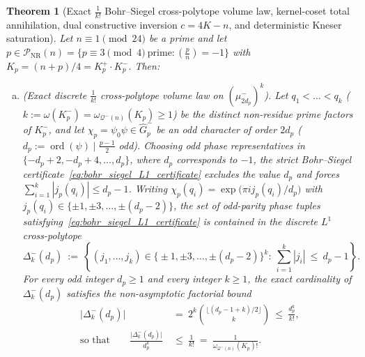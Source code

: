 \documentclass[11pt, a4paper]{article}
\theoremstyle{plain}
\newtheorem{theorem}{Theorem}[section]
\theoremstyle{definition}
\newcommand{\leg}[2]{\left(\frac{#1}{#2}\right)}
\begin{document}
\begin{theorem}[Exact $\frac{1}{k!}$ Bohr--Siegel cross-polytope volume law, kernel-coset total annihilation, dual constructive inversion $c=4K-n$, and deterministic Kneser saturation]\label{thm:cross_polytope_factorial_law_and_annihilation}
Let $n\equiv1\pmod{24}$ be a prime and let $p\in\mathcal{P}_{\mathrm{NR}}(n)=\big\{p\equiv3\pmod 4\ \text{prime}:\leg{p}{n}=-1\big\}$ with $K_p=(n+p)/4=K_p^{+}\cdot K_p^{-}$. Then:
\begin{enumerate}[(a)]
    \item \emph{(Exact discrete $\frac{1}{k!}$ cross-polytope volume law on $(\mu_{2d_p}^{-})^{k}$).} Let $q_1<\dots<q_k$ ($k:=\omega(K_p^{-})=\omega_{\mathcal{Q}^{-}(n)}(K_p)\ge1$) be the distinct non-residue prime factors of $K_p^{-}$, and let $\chi_p=\psi_0\psi\in\widehat{G}_p^{-}$ be an odd character of order $2d_p$ ($d_p:=\operatorname{ord}(\psi)\mid\frac{p-1}{2}$ odd). Choosing odd phase representatives in $\{-d_p+2,-d_p+4,\ldots,d_p\}$, where $d_p$ corresponds to $-1$, the strict Bohr--Siegel certificate~\eqref{eq:bohr_siegel_L1_certificate} excludes the value $d_p$ and forces $\sum_{i=1}^{k}|j_p(q_i)|\le d_p-1$. Writing $\chi_p(q_i)=\exp\big(\pi i j_p(q_i)/d_p\big)$ with $j_p(q_i)\in\{\pm1,\pm3,\dots,\pm(d_p-2)\}$, the set of odd-parity phase tuples satisfying~\eqref{eq:bohr_siegel_L1_certificate} is contained in the discrete $L^{1}$ cross-polytope
    \begin{equation}\label{eq:discrete_bohr_siegel_cross_polytope}
    \Delta_k^{-}(d_p)\ :=\ \left\{(j_1,\dots,j_k)\in\big\{\pm1,\pm3,\dots,\pm(d_p-2)\big\}^{k}:\ \sum_{i=1}^{k}|j_i|\ \le\ d_p-1\right\}.
    \end{equation}
    For \emph{every} odd integer $d_p\ge1$ and \emph{every} integer $k\ge1$, the exact cardinality of $\Delta_k^{-}(d_p)$ satisfies the non-asymptotic factorial bound
    \begin{equation}\label{eq:exact_factorial_simplex_bound}
    \begin{split}
    \big|\Delta_k^{-}(d_p)\big|\ &=\ 2^{k}\binom{\lfloor(d_p-1+k)/2\rfloor}{k}\ \le\ \frac{d_p^{k}}{k!},\\
    \text{so that}\qquad \frac{\big|\Delta_k^{-}(d_p)\big|}{d_p^{k}}\ &\le\ \frac{1}{k!}\ =\ \frac{1}{\omega_{\mathcal{Q}^{-}(n)}(K_p)!}.
    \end{split}
    \end{equation}


\end{enumerate}
\end{theorem}
\end{document}
